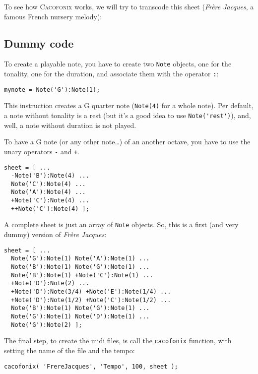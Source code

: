 \documentclass{article}
\newcommand{\cacofonix}{\textsc{Cacofonix}\xspace}
\newcommand{\note}{\lstinline!Note!\xspace}
\newcommand{\frerejaques}{\emph{Fr\`ere Jacques}\xspace}
\begin{document}
To see how \cacofonix works, we will try to transcode this sheet (\frerejaques, a famous French nursery melody):\\

\subsection{Dummy code}

To create a playable note, you have to create two \note objects, one for the tonality, one for the duration, and associate them with the operator \lstinline!:!:
\begin{lstlisting}
mynote = Note('G'):Note(1);
\end{lstlisting}
This instruction creates a G quarter note (\lstinline!Note(4)! for a whole note). Per default, a note without tonality is a rest (but it's a good idea to use \lstinline!Note('rest')!), and, well, a note without duration is not played.

To have a G note (or any other note\dots) of an another octave, you have to use the unary operators \lstinline!-! and \lstinline!+!. \\
\begin{lstlisting}
sheet = [ ...
  -Note('B'):Note(4) ...
  Note('C'):Note(4) ...
  Note('A'):Note(4) ...
  +Note('C'):Note(4) ...
  ++Note('C'):Note(4) ];
\end{lstlisting}

A complete sheet is just an array of \note objects. So, this is a first (and very dummy) version of \frerejaques:
\begin{lstlisting}
sheet = [ ...
  Note('G'):Note(1) Note('A'):Note(1) ...
  Note('B'):Note(1) Note('G'):Note(1) ...
  Note('B'):Note(1) +Note('C'):Note(1) ...
  +Note('D'):Note(2) ...
  +Note('D'):Note(3/4) +Note('E'):Note(1/4) ...
  +Note('D'):Note(1/2) +Note('C'):Note(1/2) ...
  Note('B'):Note(1) Note('G'):Note(1) ...
  Note('G'):Note(1) Note('D'):Note(1) ...
  Note('G'):Note(2) ];
\end{lstlisting}

The final step, to create the midi files, is call the \lstinline!cacofonix! function, with setting the name of the file and the tempo:
\begin{lstlisting}
cacofonix( 'FrereJacques', 'Tempo', 100, sheet );
\end{lstlisting}
\end{document}
